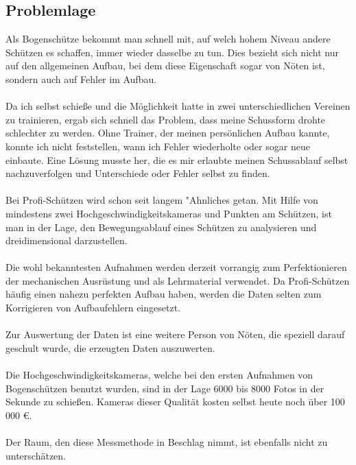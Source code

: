 \subsection{Problemlage}
Als Bogenschütze bekommt man schnell mit, auf welch hohem Niveau andere Schützen es 
schaffen, immer wieder dasselbe zu tun. Dies bezieht sich nicht nur auf den allgemeinen 
Aufbau, bei dem diese Eigenschaft sogar von Nöten ist, sondern auch auf Fehler im Aufbau.\\
\\
Da ich selbst schieße und die Möglichkeit hatte in zwei unterschiedlichen Vereinen zu 
trainieren, ergab sich schnell das Problem, dass meine Schussform drohte schlechter zu 
werden. Ohne Trainer, der meinen persönlichen Aufbau kannte, konnte ich nicht feststellen, 
wann ich Fehler wiederholte oder sogar neue einbaute. Eine Lösung musste her, die es mir 
erlaubte meinen Schussablauf selbst nachzuverfolgen und Unterschiede oder Fehler selbst zu 
finden.\\
\\
Bei Profi-Schützen wird schon seit langem "Ahnliches getan. Mit Hilfe von mindestens zwei 
Hochgeschwindigkeitskameras und Punkten am Schützen, ist man in der Lage, den 
Bewegungsablauf eines Schützen zu analysieren und dreidimensional darzustellen.\\
\\
Die wohl bekanntesten Aufnahmen werden derzeit vorrangig zum Perfektionieren der 
mechanischen Ausrüstung und als Lehrmaterial verwendet. Da Profi-Schützen häufig einen 
nahezu perfekten Aufbau haben, werden die Daten selten zum Korrigieren von Aufbaufehlern 
eingesetzt.\\
\\
Zur Auswertung der Daten ist eine weitere Person von Nöten, die speziell darauf geschult 
wurde, die erzeugten Daten auszuwerten.\\
\\
Die Hochgeschwindigkeitskameras, welche bei den ersten Aufnahmen von Bogenschützen 
benutzt wurden, sind in der Lage 6000 bis 8000 Fotos in der Sekunde zu schießen. Kameras 
dieser Qualität kosten selbst heute noch über 100 000 \euro{}.\\
\\
Der Raum, den diese Messmethode in Beschlag nimmt, ist ebenfalls nicht zu unterschätzen.

